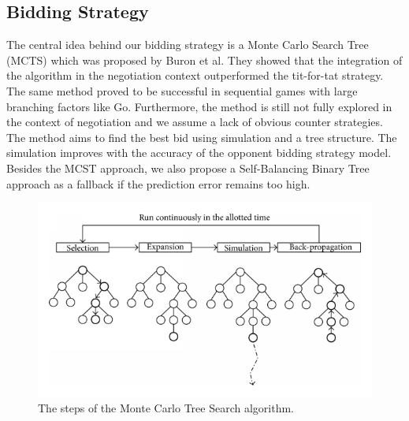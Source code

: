 \documentclass[a4paper,11pt]{article}
\theoremstyle{mytheor}
\begin{document}
\subsection{Bidding Strategy}
The central idea behind our bidding strategy is a Monte Carlo Search Tree (MCTS) which was proposed by Buron et al. \cite{Buron_Guessoum_Ductor_2019} They showed that the integration of the algorithm in the negotiation context outperformed the tit-for-tat strategy. The same method proved to be successful in sequential games with large branching factors like Go.\cite{alphago2016} Furthermore, the method is still not fully explored in the context of negotiation and we assume a lack of obvious counter strategies. The method aims to find the best bid using simulation and a tree structure. The simulation improves with the accuracy of the opponent bidding strategy model.  
Besides the MCST approach, we also propose a Self-Balancing Binary Tree approach as a fallback if the prediction error remains too high. 
\begin{figure}[h!]
  \centering
  \includegraphics[width=0.5\linewidth]{report2/mcts_pic.png}
  \caption{The steps of the Monte Carlo Tree Search algorithm.\cite{MTCS_tree_pic}}
  \label{fig:preferences}
\end{figure}
\end{document}
